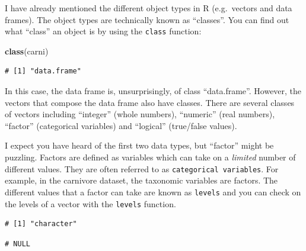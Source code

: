 \documentclass[
  a4paperpaper,
]{book}
\newenvironment{Shaded}{\begin{snugshade}}{\end{snugshade}}
\newcommand{\KeywordTok}[1]{\textcolor[rgb]{0.13,0.29,0.53}{\textbf{#1}}}
\newcommand{\NormalTok}[1]{#1}
\newcommand{\OperatorTok}[1]{\textcolor[rgb]{0.81,0.36,0.00}{\textbf{#1}}}
\begin{document}
I have already mentioned the different object types in R (e.g.~vectors and data frames). The object types are technically known as ``classes''. You can find out what ``class'' an object is by using the \texttt{class} function:

\begin{Shaded}
\begin{Highlighting}[]
\KeywordTok{class}\NormalTok{(carni)}
\end{Highlighting}
\end{Shaded}

\begin{verbatim}
# [1] "data.frame"
\end{verbatim}

In this case, the data frame is, unsurprisingly, of class ``data.frame''. However, the vectors that compose the data frame also have classes. There are several classes of vectors including ``integer'' (whole numbers), ``numeric'' (real numbers), ``factor'' (categorical variables) and ``logical'' (true/false values).

I expect you have heard of the first two data types, but ``factor'' might be puzzling. Factors are defined as variables which can take on a \emph{limited} number of different values. They are often referred to as \texttt{categorical\ variables}. For example, in the carnivore dataset, the taxonomic variables are factors. The different values that a factor can take are known as \texttt{levels} and you can check on the levels of a vector with the \texttt{levels} function.

\begin{Shaded}
\end{Shaded}

\begin{verbatim}
# [1] "character"
\end{verbatim}

\begin{Shaded}
\end{Shaded}

\begin{verbatim}
# NULL
\end{verbatim}
\end{document}
